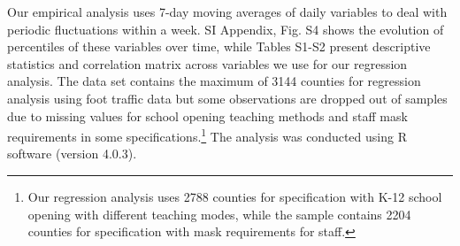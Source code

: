 \documentclass[9pt,twocolumn,twoside,lineno]{pnas-new}
\begin{document}
Our empirical analysis uses 7-day moving averages of daily variables to deal with periodic fluctuations within a week. SI Appendix, Fig. S4  shows the evolution of percentiles of these variables over time, while  Tables S1-S2 present descriptive statistics and correlation matrix across variables we use for our regression analysis.
The data set contains the maximum of 3144 counties for regression analysis using foot traffic data but some observations are dropped out of samples due to missing values for school opening teaching methods and staff mask requirements in some specifications.\footnote{Our regression analysis uses 2788 counties for specification with K-12 school opening with different teaching modes, while the sample contains 2204 counties for specification with mask requirements for staff.}  The analysis was conducted using R software (version 4.0.3).
 
\end{document}
